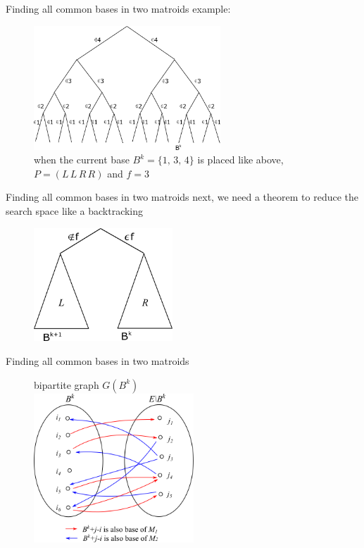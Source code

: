 \documentclass[11pt,xcolor=dvipsnames,table,dvipdfmx]{beamer}
\begin{document}
\begin{frame}{Finding all common bases in two matroids}
 example:
 \begin{figure}
  \centering
  \includegraphics[width=7cm]{text4989-10.png}\vspace{0.3cm}\\
  when the current base $B^k = \{1,\,3,\,4\}$ is placed like above,\\$P = (L\,L\,R\,R)$ and $f = 3$ 
 \end{figure}
\end{frame}

\begin{frame}{Finding all common bases in two matroids}
 next, we need a theorem to reduce the search space like a backtracking
 \begin{figure}
  \centering
  \includegraphics[width=5.2cm]{text4989-7.png}
 \end{figure}
\end{frame}

\begin{frame}{Finding all common bases in two matroids}
 \begin{figure}
  bipartite graph $G(B^k)$\vspace{1cm}\\
  \centering
  \includegraphics[width=6cm]{text8631-16-2-7.png}
 \end{figure}
\end{frame}
\end{document}
